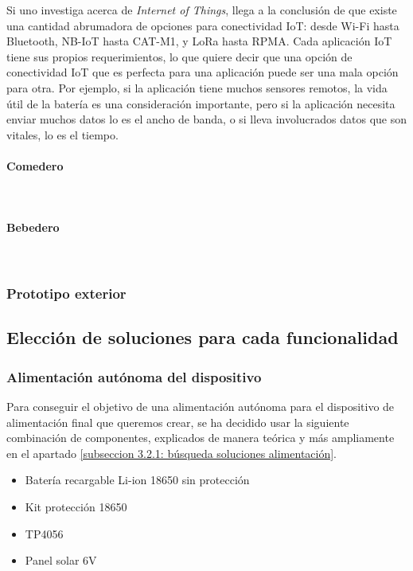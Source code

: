 \documentclass[12pt]{article}
\newcommand{\subsubsubsection}[1]{\paragraph{#1}\mbox{}\\}
\begin{document}
	\noindent Si uno investiga acerca de \textit{Internet of Things}, llega a la conclusión de que existe una cantidad abrumadora de opciones para conectividad IoT: desde Wi-Fi hasta Bluetooth, NB-IoT hasta CAT-M1, y LoRa hasta RPMA. Cada aplicación IoT tiene sus propios requerimientos, lo que quiere decir que una opción de conectividad IoT que es perfecta para una aplicación puede ser una mala opción para otra. Por ejemplo, si la aplicación tiene muchos sensores remotos, la vida útil de la batería es una consideración importante, pero si la aplicación necesita enviar muchos datos lo es el ancho de banda, o si lleva involucrados datos que son vitales, lo es el tiempo. \\
	
	\noindent 
	\subsubsubsection{Comedero}
	\subsubsubsection{Bebedero}
		
	\subsubsection{Prototipo exterior}

	
	\subsection[Elección soluciones]{Elección de soluciones para cada funcionalidad}
	
	\subsubsection{Alimentación autónoma del dispositivo}
	
	\noindent Para conseguir el objetivo de una alimentación autónoma para el dispositivo de alimentación final que queremos crear, se ha decidido usar la siguiente combinación de componentes, explicados de manera teórica y más ampliamente en el apartado \ref{subseccion 3.2.1: búsqueda soluciones alimentación}. \\
	
	\begin{itemize}
		\item Batería recargable Li-ion 18650 sin protección
		\item Kit protección 18650
		\item TP4056
		\item Panel solar 6V
	\end{itemize}
	
\end{document}
